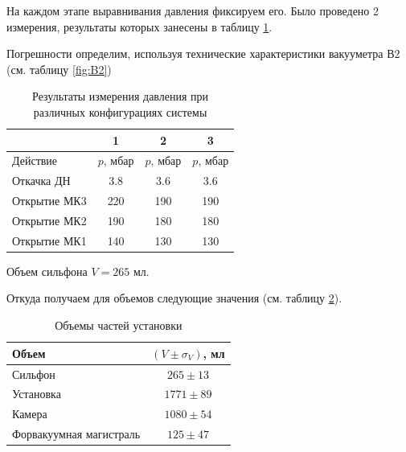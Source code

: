 \documentclass[12pt,a4paper]{article}
\begin{document}
	На каждом этапе выравнивания давления фиксируем его. Было проведено 2 измерения, результаты которых занесены в таблицу \ref{tab:press}.
	
	Погрешности определим, используя технические характеристики вакууметра В2 (см. таблицу \ref{fig:B2})
	
	\begin{table}[h]
		\caption{Результаты измерения давления при различных конфигурациях системы}
		\label{tab:press}
		\begin{center}
			\begin{tabular}{lccc}
				\toprule
				{ } & 1 & 2 & 3 \\ 
				\midrule
				Действие & $p$, мбар & $p$, мбар  & $p$, мбар  \\ 
				\midrule
				Откачка ДН           & 3.8            & 3.6      & 3.6         	   \\ 
				Открытие МК3         & 220            & 190      & 190            \\ 
				Открытие МК2         & 190            & 180      & 180            \\ 
				Открытие МК1         & 140            & 130      & 130           \\ 
				\bottomrule
			\end{tabular}
		\end{center}
	\end{table}
	
	Объем сильфона $V = 265$ мл.
	
	Откуда получаем для объемов следующие значения (см. таблицу \ref{tab:volumes}).
	\begin{table}[H]
		\caption{Объемы частей установки}
		\label{tab:volumes}
		\begin{center}
			\begin{tabular}{lc}
				\toprule
				Объем & $(V \pm \sigma_V)$, мл\\ \midrule
				Сильфон                  & $  265 \pm  13$ \\
				Установка                & $ 1771 \pm  89$ \\
				Камера                   & $ 1080 \pm  54$ \\
				Форвакуумная магистраль  & $  125 \pm  47$ \\
				\bottomrule
			\end{tabular}
		\end{center}
	\end{table}
	
\end{document}
